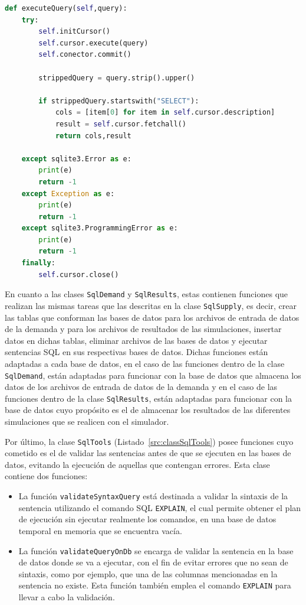 \begin{lstlisting}[language=Python,
                   style=python,
                   frame=none,
                   numbers=none,
                   basicstyle=\ttfamily\normalsize,
                   caption={Función \texttt{executeQuery}},
                   label=src:functionExecuteQuery,
                   inputencoding=utf8]                   
def executeQuery(self,query):
    try:
        self.initCursor()
        self.cursor.execute(query)
        self.conector.commit()

        strippedQuery = query.strip().upper()

        if strippedQuery.startswith("SELECT"):
            cols = [item[0] for item in self.cursor.description]
            result = self.cursor.fetchall()
            return cols,result

    except sqlite3.Error as e:
        print(e)
        return -1
    except Exception as e:
        print(e)
        return -1
    except sqlite3.ProgrammingError as e:
        print(e)
        return -1
    finally:
        self.cursor.close()
\end{lstlisting}

En cuanto a las clases \texttt{SqlDemand} y \texttt{SqlResults}, estas contienen funciones que realizan las mismas tareas que las descritas en la clase \texttt{SqlSupply}, es decir, crear las tablas que conforman las bases de datos para los archivos de entrada de datos de la demanda y para los archivos de resultados de las simulaciones, insertar datos en dichas tablas, eliminar archivos de las bases de datos y ejecutar sentencias \acrshort{SQL} en sus respectivas bases de datos. Dichas funciones están adaptadas a cada base de datos, en el caso de las funciones dentro de la clase \texttt{SqlDemand}, están adaptadas para funcionar con la base de datos que almacena los datos de los archivos de entrada de datos de la demanda y en el caso de las funciones dentro de la clase \texttt{SqlResults}, están adaptadas para funcionar con la base de datos cuyo propósito es el de almacenar los resultados de las diferentes simulaciones que se realicen con el simulador. 

Por último, la clase \texttt{SqlTools} (Listado~\ref{src:classSqlTools}) posee funciones cuyo cometido es el de validar las sentencias antes de que se ejecuten en las bases de datos, evitando la ejecución de aquellas que contengan errores. Esta clase contiene dos funciones:
\begin{itemize}
    \item La función \texttt{validateSyntaxQuery} está destinada a validar la sintaxis de la sentencia utilizando el comando SQL \texttt{EXPLAIN}, el cual permite obtener el plan de ejecución sin ejecutar realmente los comandos, en una base de datos temporal en memoria que se encuentra vacía.
    \item La función \texttt{validateQueryOnDb} se encarga de validar la sentencia en la base de datos donde se va a ejecutar, con el fin de evitar errores que no sean de sintaxis, como por ejemplo, que una de las columnas mencionadas en la sentencia no existe. Esta función también emplea el comando \texttt{EXPLAIN} para llevar a cabo la validación.
\end{itemize}


